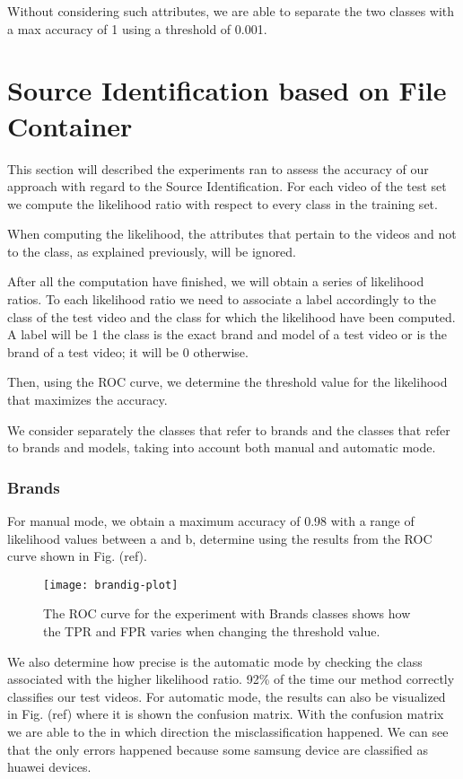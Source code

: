 Without considering such attributes, we are able to separate the two classes with a max accuracy of 1 using a threshold of 0.001.

\section{Source Identification based on File Container}

This section will described the experiments ran to assess the accuracy of our approach with regard to the Source Identification. For each video of the test set we compute the likelihood ratio with respect to every class in the training set. 

When computing the likelihood, the attributes that pertain to the videos and not to the class, as explained previously, will be ignored.

After all the computation have finished, we will obtain a series of likelihood ratios. To each likelihood ratio we need to associate a label accordingly to the class of the test video and the class for which the likelihood have been computed. A label will be 1 the class is the exact brand and model of a test video or is the brand of a test video; it will be 0 otherwise.

Then, using the ROC curve, we determine the threshold value for the likelihood that maximizes the accuracy.

We consider separately the classes that refer to brands and the classes that refer to brands and models, taking into account both manual and automatic mode.

\subsubsection*{Brands}

For manual mode, we obtain a maximum accuracy of 0.98 with a range of likelihood values between a and b, determine using the results from the ROC curve shown in Fig. (ref).

\begin{figure}
  \centering
  \texttt{[image: brandig-plot]}
  \caption{The ROC curve for the experiment with Brands classes shows how the TPR and FPR varies when changing the threshold value.}\label{fig:brand-roc}
\end{figure}

We also determine how precise is the automatic mode by checking the class associated with the higher likelihood ratio. 92\% of the time our method correctly classifies our test videos. For automatic mode, the results can also be visualized in Fig. (ref) where it is shown the confusion matrix. With the confusion matrix we are able to the in which direction the misclassification happened. We can see that the only errors happened because some samsung device are classified as huawei devices. 

